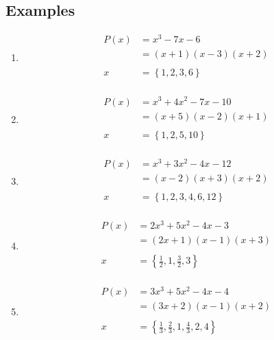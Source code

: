 \documentclass{exam}
\begin{document}
  \subsection{Examples}
  \begin{enumerate}

    \item
      \begin{align*}
        P(x) &= x^3 - 7x - 6 \\
             &= (x + 1)(x - 3)(x + 2) \\
        \\
        x    &= \left\{ 1, 2, 3, 6 \right\} \\
      \end{align*}

    \item 
      \begin{align*}
        P(x) &= x^3 + 4x^2 - 7x - 10 \\
             &= (x + 5) (x - 2) (x + 1) \\
        \\
        x    &= \left\{ 1, 2, 5, 10 \right\} \\
      \end{align*}

    \item 
      \begin{align*}
        P(x) &=x^3 + 3x^2 - 4x - 12 \\
             &= (x - 2) (x + 3) (x + 2) \\
        \\
        x    &= \left\{ 1, 2, 3, 4, 6, 12 \right\} \\
      \end{align*}

    \item 
      \begin{align*}
        P(x) &= 2x^3 + 5x^2 - 4x - 3 \\
             &= (2x + 1) (x - 1) (x + 3) \\
        \\
        x    &= \left\{ \frac{1}{2}, 1, \frac{3}{2}, 3 \right\} \\
      \end{align*}

    \item 
      \begin{align*}
        P(x) &= 3x^3 + 5x^2 - 4x - 4 \\
             &= (3x + 2) (x - 1) (x + 2) \\
        \\
        x    &= \left\{ \frac{1}{3}, \frac{2}{3}, 1, \frac{4}{3}, 2, 4 \right\} \\
      \end{align*}


\end{enumerate}
\end{document}
